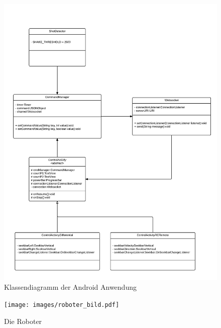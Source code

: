 \begin{figure}
	\includegraphics[width=\textwidth]{images/uml_android_app.pdf}
	\caption{Klassendiagramm der Android Anwendung}
	\label{fig:android_uml}
\end{figure}

\begin{figure}
	\texttt{[image: images/roboter\_bild.pdf]}
	\caption{Die Roboter}
	\label{fig:robot_pic}
\end{figure}


